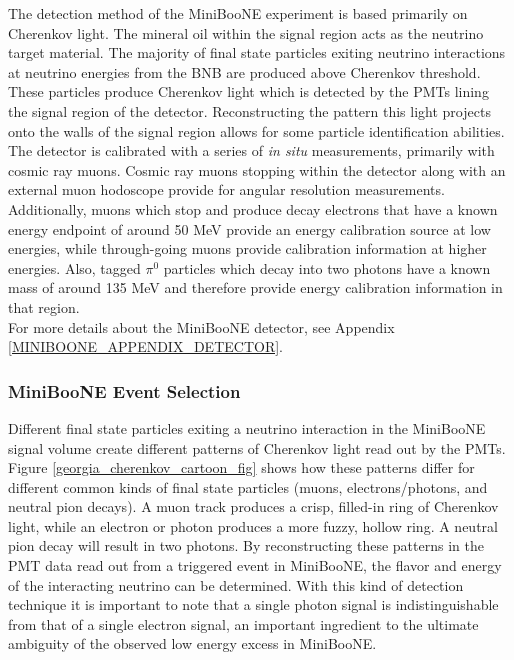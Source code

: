 The detection method of the MiniBooNE experiment is based primarily on Cherenkov light. The mineral oil within the signal region acts as the neutrino target material. The majority of final state particles exiting neutrino interactions at neutrino energies from the BNB are produced above Cherenkov threshold. These particles produce Cherenkov light which is detected by the PMTs lining the signal region of the detector. Reconstructing the pattern this light projects onto the walls of the signal region allows for some particle identification abilities.\\

The detector is calibrated with a series of \textit{in situ} measurements, primarily with cosmic ray muons. Cosmic ray muons stopping within the detector along with an external muon hodoscope provide for angular resolution measurements. Additionally, muons which stop and produce decay electrons that have a known energy endpoint of around 50 MeV provide an energy calibration source at low energies, while through-going muons provide calibration information at higher energies. Also, tagged $\pi^0$ particles which decay into two photons have a known mass of around 135 MeV and therefore provide energy calibration information in that region.\\

For more details about the MiniBooNE detector, see Appendix \ref{MINIBOONE_APPENDIX_DETECTOR}.

\subsubsection{MiniBooNE Event Selection}

Different final state particles exiting a neutrino interaction in the MiniBooNE signal volume create different patterns of Cherenkov light read out by the PMTs. Figure \ref{georgia_cherenkov_cartoon_fig} \cite{GeorgiaThesis} shows how these patterns differ for different common kinds of final state particles (muons, electrons/photons, and neutral pion decays). A muon track produces a crisp, filled-in ring of Cherenkov light, while an electron or photon produces a more fuzzy, hollow ring. A neutral pion decay will result in two photons. By reconstructing these patterns in the PMT data read out from a triggered event in MiniBooNE, the flavor and energy of the interacting neutrino can be determined. With this kind of detection technique it is important to note that a single photon signal is indistinguishable from that of a single electron signal, an important ingredient to the ultimate ambiguity of the observed low energy excess in MiniBooNE.\\

